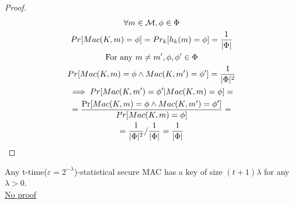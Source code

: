 \begin{proof}
    \begin{gather*}
        \forall m \in \mathcal{M}, \phi \in \Phi\\
        Pr[Mac(K,m)=\phi]=Pr_k[h_k(m)=\phi]=\frac{1}{|\Phi|}\\
        \text{For any } m\neq m', \phi,\phi' \in \Phi\\
        Pr[Mac(K,m)=\phi \wedge Mac(K,m')=\phi']=\frac{1}{|\Phi|^2}\\
        \implies Pr[Mac(K,m')=\phi'| Mac(K,m)=\phi]=\\
        =\frac{\Pr[Mac(K,m)=\phi \wedge Mac(K,m')=\phi']}{Pr[Mac(K,m)=\phi]}=\\
        =\frac{1}{|\Phi|^2}/\frac{1}{|\Phi|}=\frac{1}{|\Phi|}
    \end{gather*}
\end{proof}
\begin{theorem}
    Any t-time($\varepsilon=2^{-\lambda}$)-statistical secure MAC has a key of size $(t+1) \lambda$ for any $\lambda > 0$.\\
    \underline{No proof}
\end{theorem}
